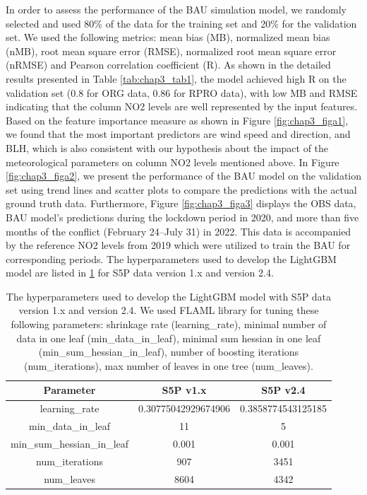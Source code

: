 In order to assess the performance of the BAU simulation model, we randomly selected and used 80\% of the data for the training set and 20\% for the validation set. We used the following metrics: mean bias (MB), normalized mean bias (nMB), root mean square error (RMSE), normalized root mean square error (nRMSE) and Pearson correlation coefficient (R). As shown in the detailed results presented in Table \ref{tab:chap3_tab1}, the model achieved high R on the validation set (0.8 for ORG data, 0.86 for RPRO data), with low MB and RMSE indicating that the column NO2 levels are well represented by the input features. Based on the feature importance measure as shown in Figure \ref{fig:chap3_figa1}, we found that the most important predictors are wind speed and direction, and BLH, which is also consistent with our hypothesis about the impact of the meteorological parameters on column NO2 levels mentioned above. In Figure \ref{fig:chap3_figa2}, we present the performance of the BAU model on the validation set using trend lines and scatter plots to compare the predictions with the actual ground truth data. Furthermore, Figure \ref{fig:chap3_figa3} displays the OBS data, BAU model’s predictions during the lockdown period in 2020, and more than five months of the conflict (February 24–July 31) in 2022. This data is accompanied by the reference NO2 levels from 2019 which were utilized to train the BAU for corresponding periods. The hyperparameters used to develop the LightGBM model are listed in \ref{tab:chap3_taba1} for S5P data version 1.x and version 2.4. \par

\begin{table}[!ht]
    \centering
    \caption[The hyperparameters used to develop the LightGBM model]{The hyperparameters used to develop the LightGBM model with S5P data version 1.x and version 2.4. We used FLAML library \citep{wang2021flaml} for tuning these following parameters: shrinkage rate (learning\_rate), minimal number of data in one leaf (min\_data\_in\_leaf), minimal sum hessian in one leaf (min\_sum\_hessian\_in\_leaf), number of boosting iterations (num\_iterations), max number of leaves in one tree (num\_leaves).}
    \begin{tabular}{c c c}
        \hline
            Parameter & S5P v1.x & S5P v2.4  \\ \hline
            learning\_rate & 0.30775042929674906 & 0.3858774543125185  \\
            min\_data\_in\_leaf & 11 & 5  \\
            min\_sum\_hessian\_in\_leaf & 0.001 & 0.001  \\
            num\_iterations & 907 & 3451  \\
            num\_leaves & 8604 & 4342  \\ \hline
    \end{tabular}
    \label{tab:chap3_taba1}

\end{table}

